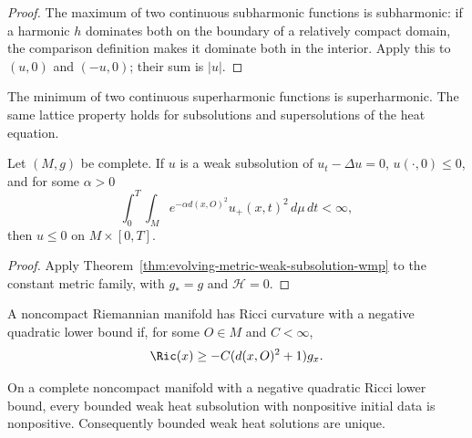 \begin{proof}
\sketch
{}
The maximum of two continuous subharmonic functions is subharmonic: if a
harmonic $h$ dominates both on the boundary of a relatively compact domain,
the comparison definition makes it dominate both in the interior.  Apply this
to $(u,0)$ and $(-u,0)$; their sum is $|u|$.
\end{proof}

\begin{remark}
\label{rem:minimum-superharmonic-functions}
The minimum of two continuous superharmonic functions is superharmonic.  The
same lattice property holds for subsolutions and supersolutions of the heat
equation.
\end{remark}

\begin{theorem}
\label{thm:static-weak-subsolution-wmp}
Let $(M,g)$ be complete.  If $u$ is a weak subsolution of $u_t-\Delta u=0$,
$u(\cdot,0)\leq0$, and for some $\alpha>0$
\[
\int_0^T\!\int_M e^{-\alpha d(x,O)^2}u_+(x,t)^2\,d\mu\,dt<\infty,
\]
then $u\leq0$ on $M\times[0,T]$.
\end{theorem}

\begin{proof}
\sketch
{}
Apply Theorem~\ref{thm:evolving-metric-weak-subsolution-wmp} to the constant
metric family, with $g_*=g$ and $\mathcal H=0$.
\end{proof}

\begin{definition}
\label{def:negative-quadratic-ricci-lower-bound}
A noncompact Riemannian manifold has Ricci curvature with a negative
quadratic lower bound if, for some $O\in M$ and $C<\infty$,
\[
\Ric(x)\geq-C(d(x,O)^2+1)g_x.
\]
\end{definition}

\begin{corollary}
\label{cor:bounded-weak-subsolution-wmp}
On a complete noncompact manifold with a negative quadratic Ricci lower
bound, every bounded weak heat subsolution with nonpositive initial data is
nonpositive.  Consequently bounded weak heat solutions are unique.
\end{corollary}

